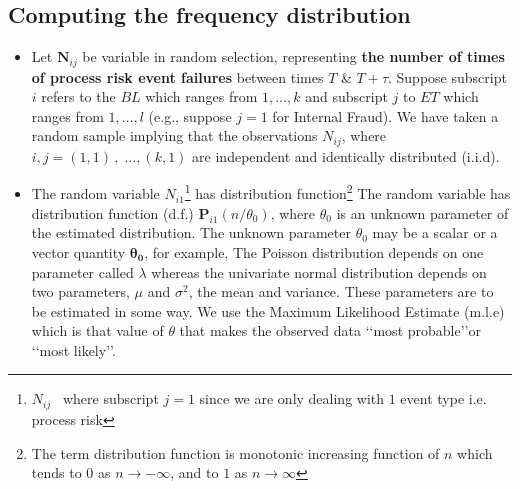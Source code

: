 \documentclass{DissertateUSU}
\begin{document}
\subsection{Computing the frequency distribution}
\label{ssec:Computing the frequency distribution}

\begin{itemize}
\item Let $\mathbf{N}_{ij}$ be variable in random selection, representing \textbf{the number of times of process risk event failures} between times $T$ \& $T +\tau$. Suppose subscript $i$ refers to the $BL$ which ranges from \begin{math} 1, \ldots, k \end{math} and subscript $j$ to $ET$ which ranges from \begin{math} 1, \ldots, l \end{math} (e.g., suppose $j=1$ for Internal Fraud). We have taken a random sample implying that the observations \begin{math} N_{ij}\end{math}, {where} \begin{math}{i,j}= (1,1)\,,\;\ldots, (k,1)\end{math} are independent and identically distributed (i.i.d). 

\item The random variable $N_{i1}$\footnote{$N_{ij}$ \, where subscript $j=1$ since we are only dealing with $1$ event type i.e. process risk} has distribution function\footnote{The term distribution function is monotonic increasing function of $n$ which tends to $0$ as \begin{math} n \longrightarrow -\infty\end{math}, and to $1$ as \begin{math} n \longrightarrow \infty \end{math}} The random variable has distribution function (d.f.) \begin{math}\mathbf{P}_{i1}(n/\theta_0)  \end{math}, where $\theta_0$ is an unknown parameter of the estimated distribution.  The unknown parameter $\theta_0$ may be a scalar or a vector quantity \begin{math}\mathbf{\theta_0}\end{math}, for example, The Poisson distribution depends on one parameter called $\lambda$ whereas the univariate normal distribution depends on two parameters, $\mu$ and $\sigma ^2$, the mean and variance.  These parameters are to be estimated in some way. We use the Maximum Likelihood Estimate (m.l.e) which is that value of $\theta$ that makes the observed data \lq\lq most probable\rq\rq or \lq\lq most likely\rq\rq.\medskip


\end{itemize}
\end{document}
